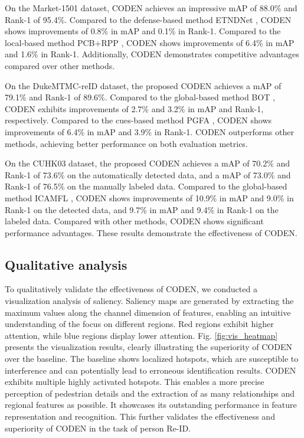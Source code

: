 \documentclass[12pt]{spieman}  %
\begin{document}
\begin{spacing}{2}
		On the Market-1501 dataset, CODEN achieves an impressive mAP of 88.0\% and Rank-1 of 95.4\%. Compared to the defense-based method ETNDNet  \cite{dong2023erasing}, CODEN shows improvements of 0.8\% in mAP and 0.1\% in Rank-1. Compared to the local-based method PCB+RPP \cite{sun2018beyond}, CODEN shows improvements of 6.4\% in mAP and 1.6\% in Rank-1. Additionally, CODEN demonstrates competitive advantages compared over other methods.
		
		On the DukeMTMC-reID dataset, the proposed CODEN achieves a mAP of 79.1\% and Rank-1 of 89.6\%. Compared to the global-based method BOT \cite{luo2019bag}, CODEN exhibits improvements of 2.7\% and 3.2\% in mAP and Rank-1, respectively. Compared to the cues-based method PGFA \cite{miao2019pose}, CODEN shows improvements of 6.4\% in mAP and 3.9\% in Rank-1. CODEN outperforms other methods, achieving better performance on both evaluation metrics.
		
		On the CUHK03 dataset, the proposed CODEN achieves a mAP of 70.2\% and Rank-1 of 73.6\% on the automatically detected data, and a mAP of 73.0\% and Rank-1 of 76.5\% on the manually labeled data. Compared to the global-based method ICAMFL \cite{wang2023information}, CODEN shows improvements of 10.9\% in mAP and 9.0\% in Rank-1 on the detected data, and 9.7\% in mAP and 9.4\% in Rank-1 on the labeled data. Compared with other methods, CODEN shows significant performance advantages. These results demonstrate the effectiveness of CODEN.
		
		\subsection{Qualitative analysis}
		To qualitatively validate the effectiveness of CODEN, we conducted a visualization analysis of saliency. Saliency maps are generated by extracting the maximum values along the channel dimension of features, enabling an intuitive understanding of the focus on different regions. Red regions exhibit higher attention, while blue regions display lower attention. Fig. \ref{fig:vis_heatmap} presents the visualization results, clearly illustrating the superiority of CODEN over the baseline. The baseline shows localized hotspots, which are susceptible to interference and can potentially lead to erroneous identification results. CODEN exhibits multiple highly activated hotspots. This enables a more precise perception of pedestrian details and the extraction of as many relationships and regional features as possible. It showcases its outstanding performance in feature representation and recognition. This further validates the effectiveness and superiority of CODEN in the task of person Re-ID.
		

\end{spacing}
\end{document}
